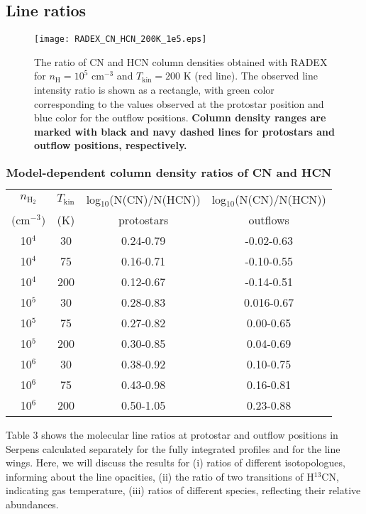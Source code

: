 \documentclass{aa}
\begin{document}
\subsection{Line ratios}
\begin{figure} 
\centering 
\texttt{[image: RADEX\_CN\_HCN\_200K\_1e5.eps]}
\caption{The ratio of CN and HCN column densities obtained with RADEX for $n_\mathrm{H} = 10^5$ cm$^{-3}$ and
$T_\mathrm{kin} = 200$ K (red line). The observed line intensity ratio is
shown as a rectangle, with green color corresponding to the values observed at the 
protostar position and blue color for the outflow positions. \textbf{Column density ranges are marked with black and navy dashed lines for protostars and outflow positions, respectively.}} 
\label{model} 
\end{figure}
\begin{table} \caption{\textbf{Model-dependent column density ratios of CN and HCN} }     
 \centering                     
  \begin{tabular}{c c c c} 
  \hline\hline $n_\mathrm{H_2}$ & $T_\mathrm{kin}$ &
log$_{10}$(N(CN)/N(HCN)) &
log$_{10}$(N(CN)/N(HCN)) \\ 
$($cm$^{-3})$ & (K) & protostars & outflows \\ 
\hline 10$^{4}$ & 30 & 0.24-0.79 & -0.02-0.63  \\
 10$^{4}$ & 75 & 0.16-0.71 & -0.10-0.55 \\
  10$^{4}$ & 200 & 0.12-0.67 & -0.14-0.51 \\ 
  10$^{5}$ & 30 & 0.28-0.83 & 0.016-0.67 \\
   10$^{5}$ & 75 & 0.27-0.82 & 0.00-0.65 \\
    10$^{5}$ & 200 & 0.30-0.85 & 0.04-0.69 \\ 
    10$^{6}$ & 30 & 0.38-0.92 & 0.10-0.75 \\ 
    10$^{6}$ & 75 & 0.43-0.98 & 0.16-0.81 \\ 
    10$^{6}$ & 200 & 0.50-1.05 & 0.23-0.88\\
     \hline 
     \end{tabular} 
     \end{table}
Table 3 shows the molecular line ratios at protostar and outflow positions in Serpens 
calculated separately for the fully integrated profiles and for the line wings. 
Here, we will discuss the results for (i) ratios of different isotopologues, informing 
about the line opacities, (ii) the ratio of two transitions of H$^{13}$CN,
indicating gas temperature, (iii) ratios of different species, reflecting 
their relative abundances.
\end{document}
